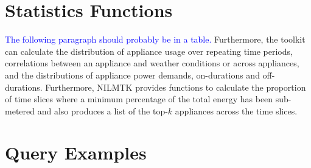 \documentclass{sig-alternate}
\newcommand{\bluecolor}[1]{\textcolor{blue}{#1}}
\begin{document}
\section{Statistics Functions}
\label{app:stats_funcs}

\bluecolor{The following paragraph should probably be in a table.}
Furthermore, the toolkit can calculate the distribution of appliance
usage over repeating time periods, correlations between an appliance
and weather conditions or across appliances, and the distributions of
appliance power demands, on-durations and off-durations.  Furthermore,
NILMTK provides functions to calculate the proportion of time slices
where a minimum percentage of the total energy has been sub-metered
and also produces a list of the top-$k$ appliances across the time
slices.

\section{Query Examples}
\label{app:examples}





\end{document}
